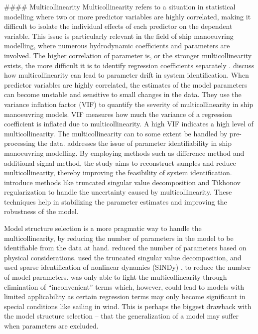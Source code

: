 #### Multicollinearity
Multicollinearity refers to a situation in statistical modelling where two or more predictor variables are highly correlated, making it difficult to isolate the individual effects of each predictor on the dependent variable. This issue is particularly relevant in the field of ship manoeuvring modelling, where numerous hydrodynamic coefficients and parameters are involved.
The higher correlation of parameter is, or the stronger multicollinearity exists, the more difficult it is to identify regression coefficients separately \cite{yoonIdentificationHydrodynamicCoefficients2003}.
\cite{wangQuantifyingMulticollinearityShip2018} discuss how multicollinearity can lead to parameter drift in system identification. When predictor variables are highly correlated, the estimates of the model parameters can become unstable and sensitive to small changes in the data. They use the variance inflation factor (VIF) to quantify the severity of multicollinearity in ship manoeuvring models. VIF measures how much the variance of a regression coefficient is inflated due to multicollinearity. A high VIF indicates a high level of multicollinearity.
The multicollinearity can to some extent be handled by pre-processing the data.
\cite{luoParameterIdentificationShip2016} addresses the issue of parameter identifiability in ship manoeuvring modelling. By employing methods such as difference method and additional signal method, the study aims to reconstruct samples and reduce multicollinearity, thereby improving the feasibility of system identification.
\cite{xuUncertaintyAnalysisHydrodynamic2019} introduce methods like truncated singular value decomposition and Tikhonov regularization to handle the uncertainty caused by multicollinearity. These techniques help in stabilizing the parameter estimates and improving the robustness of the model.

Model structure selection is a more pragmatic way to handle the multicollinearity, by reducing the number of parameters in the model to be identifiable from the data at hand.  \cite{luoParameterIdentificationShip2016} reduced the number of parameters based on physical considerations. \cite{costaRobustParameterEstimation2021} used the truncated singular value decomposition, and \cite{liuPhysicsinformedIdentificationMarine2024} used sparse identification of nonlinear dynamics (SINDy) \cite{bruntonDiscoveringGoverningEquations2016}, to reduce the number of model parameters. 
\cite{abkowitzMEASUREMENTHYDRODYNAMICCHARACTERISTICS1980} was only able to fight the multicollinearity through elimination of “inconvenient” terms which, however, could lead to models with limited applicability as certain regression terms may only become significant in special conditions like sailing in wind. This is perhaps the biggest drawback with the model structure selection – that the generalization of a model may suffer when parameters are excluded.

